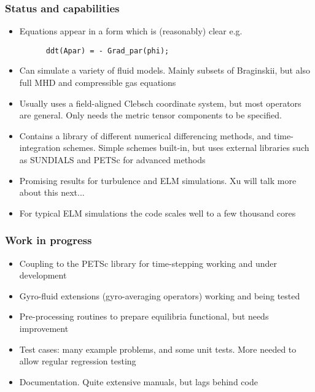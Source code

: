\documentclass{beamer}
\begin{document}
\begin{frame}[fragile]
  \frametitle{Status and capabilities}
  \begin{itemize}
  \item Equations appear in a form which is (reasonably) clear e.g.
    \begin{verbatim}
      ddt(Apar) = - Grad_par(phi);
    \end{verbatim}
    \vspace{-0.5cm}
  \item Can simulate a variety of fluid models. Mainly subsets of
    Braginskii, but also full MHD and compressible gas equations
    \pause
  \item Usually uses a field-aligned Clebsch coordinate system, but
    most operators are general. Only needs the metric tensor components
    to be specified.
    \pause
  \item Contains a library of different numerical differencing methods,
    and time-integration schemes. Simple schemes built-in, but uses
    external libraries such as SUNDIALS and PETSc for advanced methods
    \pause
  \item Promising results for turbulence and ELM simulations. Xu
    will talk more about this next...
  \item For typical ELM simulations the code scales well to
    a few thousand cores
  \end{itemize}
\end{frame}

\begin{frame}
  \frametitle{Work in progress}
  
  \begin{itemize}
  \item Coupling to the PETSc library for time-stepping working and under
    development
  \item Gyro-fluid extensions (gyro-averaging operators) working and
    being tested
  \item Pre-processing routines to prepare equilibria functional, but 
    needs improvement
  \item Test cases: many example problems, and some unit tests. More needed to
    allow regular regression testing
  \item Documentation. Quite extensive manuals, but lags behind code
  \end{itemize}
\end{frame}
\end{document}
